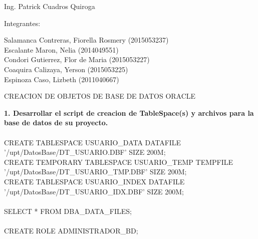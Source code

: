 \documentclass[12pt,letterpaper]{article}
\begin{document}
\begin{titlepage}
\begin{center}
\vspace*{0.1in}
\begin{large}
 Ing. Patrick Cuadros Quiroga\\
\end{large}

\vspace*{0.2in}
\vspace*{0.1in}
\begin{large}
Integrantes: \\
\vspace{\baselineskip}
\begin{flushleft}
Salamanca Contreras, Fiorella Rosmery		\hfill	(2015053237) \\
Escalante Maron, Nelia 		\hfill	(2014049551) \\
Condori Gutierrez, Flor de Maria            	\hfill	(2015053227) \\
Coaquira Calizaya, Yerson      	\hfill	(2015053225) \\
Espinoza Caso, Lizbeth  		\hfill	(2011040667) \\
\end{flushleft}
\end{large}
\end{center}

\end{titlepage}

\newpage

	\begin{center}
		\Large CREACION DE OBJETOS DE BASE DE DATOS ORACLE
	\end{center}
	\vspace{\baselineskip}
	\vspace{\baselineskip}
	\textbf{\Large 1. Desarrollar el script de creacion de TableSpace(s) y archivos para la base de datos de su proyecto.}
	\\\\
	CREATE TABLESPACE USUARIO\_DATA DATAFILE '/upt/DatosBase/DT\_USUARIO.DBF' SIZE 200M;\\
	CREATE TEMPORARY TABLESPACE USUARIO\_TEMP TEMPFILE\\ '/upt/DatosBase/DT\_USUARIO\_TMP.DBF' SIZE 200M;\\
	CREATE TABLESPACE USUARIO\_INDEX DATAFILE '/upt/DatosBase/DT\_USUARIO\_IDX.DBF' SIZE 200M;\\\\ 	
	SELECT * FROM DBA\_DATA\_FILES;\\\\	
	CREATE ROLE ADMINISTRADOR\_BD;\\\\
	
\end{document}
